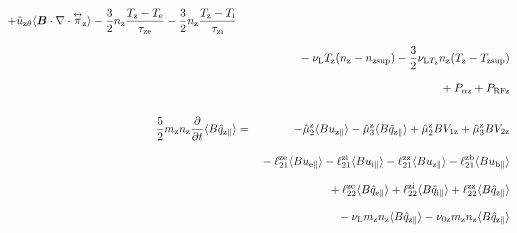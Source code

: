 \documentclass[11pt]{article}
\def\bvec#1{\leavevmode\hbox{\boldmath$#1$}}
\let\vec=\bvec
\def\r#1{{\rm#1}}
\def\aves#1{\langle#1\rangle}
\def\tensor#1{\mathord{\displaystyle\mathop{#1}^\leftrightarrow}}
\def\para{\parallel}
\def\ddt{\frac{\partial}{\partial t}}
\def\mz{m_\r{z}}
\def\nz{n_\r{z}}
\def\Te{T_\r{e}}
\def\Ti{T_\r{i}}
\def\Tz{T_\r{z}}
\def\upara#1{u_{\r{#1}\para}}
\def\uhatth#1{\hat{u}_{\r{#1}\theta}}
\def\qhatpara#1{\hat{q}_{\r{#1}\para}}
\def\nun#1{\nu_\r{0#1}}
\def\nsup#1{n_\r{#1sup}}
\def\Tsup#1{T_\r{#1sup}}
\def\nuLT#1{\nu_{\r{L}T_\r{#1}}}
\def\PRF#1{P_\r{RF#1}}
\def\Palp#1{P_{\alpha\r{#1}}}
\def\nuL{\nu_\r{L}}
\begin{document}
\begin{eqnarray}
%
  + \uhatth{z} \aves{\vec{B}\cdot\nabla\cdot\tensor{\pi}_\r{z}}
%
  - \frac{3}{2} \nz \frac{ \Tz - \Te }{\tau_\r{ze}}
  - \frac{3}{2} \nz \frac{ \Tz - \Ti }{\tau_\r{zi}}
\nonumber\\[2.5mm]&&{}
%
  - \nuL \Tz (\nz - \nsup{z})
%
  - \frac{3}{2} \nuLT{z} \nz (\Tz - \Tsup{z})
\nonumber\\[2.5mm]&&{}
%
  + \Palp{z}
%
  + \PRF{z}
\\[5mm]
 \frac{5}{2} \mz \nz \ddt \aves{B \qhatpara{z}} &=&
%
  - \hat{\mu}_2^\r{z} \aves{B \upara{z}} 
  - \hat{\mu}_3^\r{z} \aves{B \qhatpara{z}}
%
  + \hat{\mu}_2^\r{z} {B V_{1\r{z}}} 
  + \hat{\mu}_3^\r{z} {B V_{2\r{z}}}
\nonumber\\[3mm]&&{}
%
  - \ell_{21}^{\r{ze}} \aves{B \upara{e}}
  - \ell_{21}^{\r{zi}} \aves{B \upara{i}}
  - \ell_{21}^{\r{zz}} \aves{B \upara{z}}
  - \ell_{21}^{\r{zb}} \aves{B \upara{b}}
\nonumber\\[3mm]&&{}
%
  + \ell_{22}^{\r{ze}} \aves{B \qhatpara{e}}
  + \ell_{22}^{\r{zi}} \aves{B \qhatpara{i}}
  + \ell_{22}^{\r{zz}} \aves{B \qhatpara{z}}
\nonumber\\[3mm]&&{}
%
  - \nuL \mz \nz \aves{B \qhatpara{z}}
%
  - \nun{z} \mz \nz \aves{B \qhatpara{z}}
\end{eqnarray}
%
\end{document}
